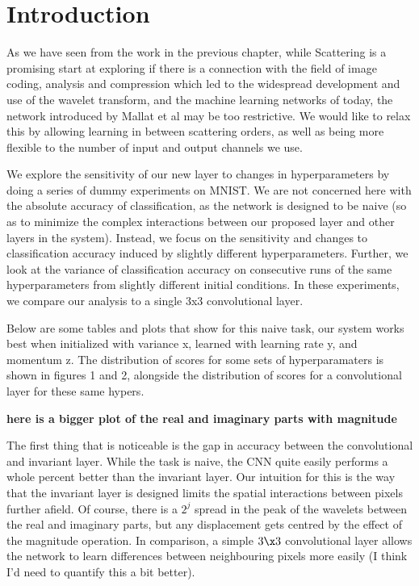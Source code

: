 \section{Introduction}

As we have seen from the work in the previous chapter, while Scattering is a
promising start at exploring if there is a connection with the field of image
coding, analysis and compression which led to the widespread development and use
of the wavelet transform, and the machine learning networks of today, the
network introduced by Mallat et al may be too restrictive. We would like to
relax this by allowing learning in between scattering orders, as well as being
more flexible to the number of input and output channels we use. 




We explore the sensitivity of our new layer to changes in hyperparameters by
doing a series of dummy experiments on MNIST. We are not concerned here with the
absolute accuracy of classification, as the network is designed to be naive (so
as to minimize the complex interactions between our proposed layer and other
layers in the system). Instead, we focus on the sensitivity and changes to
classification accuracy induced by slightly different hyperparameters. Further,
we look at the variance of classification accuracy on consecutive runs of the
same hyperparameters from slightly different initial conditions. In these
experiments, we compare our analysis to a single 3x3 convolutional layer.

Below are some tables and plots that show for this naive task, our system works best when initialized
with variance x, learned with learning rate y, and momentum z. The distribution
of scores for some sets of hyperparamaters is shown in figures 1 and 2,
alongside the distribution of scores for a convolutional layer for these same
hypers.

\textbf{here is a bigger plot of the real and imaginary parts with magnitude}

The first thing that is noticeable is the gap in accuracy between the
convolutional and invariant layer. While the task is naive, the CNN quite easily
performs a whole percent better than the invariant layer. Our intuition for this
is the way that the invariant layer is designed limits the spatial interactions
between pixels further afield. Of course, there is a $2^j$ spread in the peak of
the wavelets between the real and imaginary parts, but any displacement gets
centred by the effect of the magnitude operation. In comparison, a simple $3\x
3$ convolutional layer allows the network to learn differences between
neighbouring pixels more easily (I think I'd need to quantify this a bit
better). 

